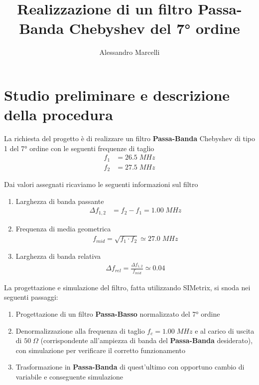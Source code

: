 \documentclass[a4paper,12pt]{report}
\title{Realizzazione di un filtro Passa-Banda Chebyshev del 7° ordine}
\author{Alessandro Marcelli}
\begin{document}
\maketitle

\tableofcontents

\newpage

\section{Studio preliminare e descrizione della procedura}

La richiesta del progetto è di realizzare un filtro \textbf{Passa-Banda} Chebyshev di tipo 1 del 7° ordine  con le seguenti frequenze di taglio
\begin{align}
f_1 &= 26.5 \; MHz\\
f_2 &= 27.5  \; MHz
\end{align}

Dai valori assegnati ricaviamo le seguenti informazioni sul filtro
\begin{enumerate}
	\item Larghezza di banda passante
	\begin{align}
	\Delta f_{1,2} &= f_2 - f_1   =  1.00  \; MHz
	\end{align}
	
	\item Frequenza di media geometrica
	\begin{align}
	f_{mid} = \sqrt{f_1 \cdot f_2} \simeq 27.0 \; MHz
	\end{align}
	
	\item Larghezza di banda relativa
	\begin{align}
	\Delta f_{rel} =\frac{\Delta f_{1,2}}{f_{mid}} \simeq 0.04
	\end{align}
	
\end{enumerate}	

La progettazione e simulazione del filtro, fatta utilizzando SIMetrix, si snoda nei seguenti passaggi:
\begin{enumerate}
	\item Progettazione di un filtro \textbf{Passa-Basso} normalizzato del 7° ordine
	\item Denormalizzazione alla frequenza di taglio $f_c = 1.00 \; MHz$ e al carico di uscita di $50 \; \Omega$ (corrispondente all'ampiezza di banda del \textbf{Passa-Banda} desiderato), con simulazione per verificare il corretto funzionamento
	\item Trasformazione in \textbf{Passa-Banda} di quest'ultimo con opportuno cambio di variabile e conseguente simulazione
\end{enumerate}
\end{document}
